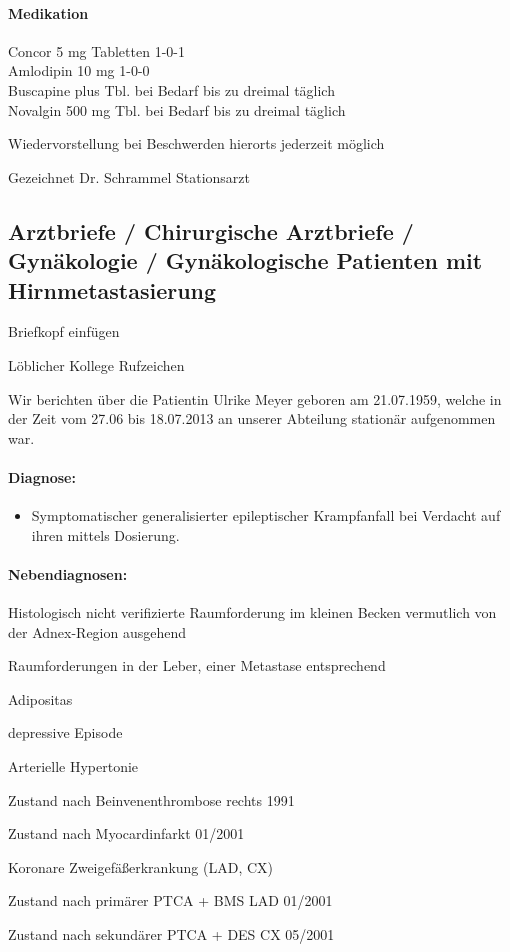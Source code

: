 \documentclass[
ngerman,
paper=a4,
asymmetric,
fontsize=10pt,
draft=false,
numbers=noenddot,
bibtotocnumbered,
footnotes=multiple,
]{scrreprt}
\newcommand{\jNEU}{\vspace{6pt}\noindent{\color{green}\sffamily\textbf{ADDED}\hrulefill\newline}}
\newcommand{\jNEUende}{\newline{\color{green}\rule{\linewidth}{3pt}\newline}}
\begin{document}
\paragraph{Medikation} 

Concor 5 mg Tabletten 1-0-1 \\
Amlodipin 10 mg
1-0-0\\
Buscapine plus Tbl. bei Bedarf bis zu dreimal täglich \\
Novalgin 500 mg Tbl. bei Bedarf bis zu dreimal täglich

Wiedervorstellung bei Beschwerden hierorts jederzeit möglich

Gezeichnet Dr. Schrammel 
Stationsarzt 
\jNEUende

\subsection{Arztbriefe / Chirurgische Arztbriefe / Gynäkologie / Gynäkologische
Patienten mit Hirnmetastasierung}

\jNEU
Briefkopf einfügen

Löblicher Kollege Rufzeichen

Wir berichten über die Patientin Ulrike Meyer geboren am
21.07.1959, welche in der Zeit vom 27.06 bis 18.07.2013 an
unserer Abteilung stationär aufgenommen war. 


\paragraph{Diagnose:}

\begin{itemize}
  \item Symptomatischer generalisierter epileptischer Krampfanfall
bei Verdacht auf ihren mittels Dosierung.
\end{itemize}



\paragraph{Nebendiagnosen:}
\begin{compactitem}
\item 
Histologisch nicht verifizierte Raumforderung im kleinen
Becken vermutlich von der Adnex-Region ausgehend 
\item Raumforderungen in der Leber, einer Metastase
entsprechend
  \item Adipositas 
  \item   depressive Episode 
  \item   Arterielle
Hypertonie 
\item Zustand nach Beinvenenthrombose rechts 1991
\item Zustand nach Myocardinfarkt 01/2001 
\item Koronare
Zweigefäßerkrankung (LAD,
CX) 
\item Zustand nach primärer PTCA + BMS LAD 01/2001
\item Zustand nach sekundärer PTCA + DES CX 05/2001
\end{compactitem}
\end{document}
